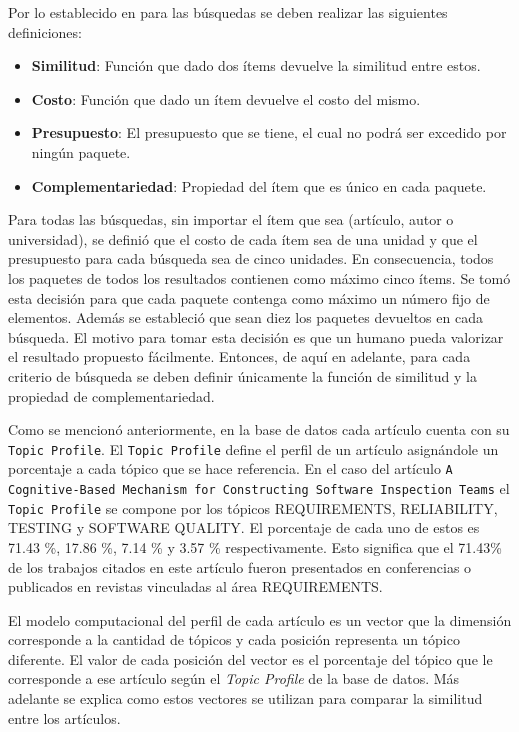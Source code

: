Por lo establecido en \cite{journals/tkde/Amer-YahiaBCFMZ14} para las búsquedas se deben realizar las siguientes definiciones:
\begin{itemize}
  \item \textbf{Similitud}: Función que dado dos ítems devuelve la similitud entre estos.
  \item \textbf{Costo}: Función que dado un ítem devuelve el costo del mismo.
  \item \textbf{Presupuesto}: El presupuesto que se tiene, el cual no podrá ser excedido por ningún paquete.
  \item \textbf{Complementariedad}: Propiedad del ítem que es único en cada paquete.
\end{itemize}

Para todas las búsquedas, sin importar el ítem que sea (artículo, autor o universidad), se definió que el costo de cada ítem sea de una unidad y que el presupuesto para cada búsqueda sea de cinco unidades. En consecuencia, todos los paquetes de todos los resultados contienen como máximo cinco ítems. Se tomó esta decisión para que cada paquete contenga como máximo un número fijo de elementos. Además se estableció que sean diez los paquetes devueltos en cada búsqueda. El motivo para tomar esta decisión es que un humano pueda valorizar el resultado propuesto fácilmente. Entonces, de aquí en adelante, para cada criterio de búsqueda se deben definir únicamente la función de similitud y la propiedad de complementariedad.

Como se mencionó anteriormente, en la base de datos cada artículo cuenta con su \texttt{Topic Profile}. El \texttt{Topic Profile} define el perfil de un artículo asignándole un porcentaje a cada tópico que se hace referencia. En el caso del artículo \texttt{A Cognitive-Based Mechanism for Constructing Software Inspection Teams} el \texttt{Topic Profile} se compone por los tópicos  REQUIREMENTS, RELIABILITY, TESTING y SOFTWARE QUALITY. El porcentaje de cada uno de estos es 71.43 \%, 17.86 \%, 7.14 \% y 3.57 \% respectivamente. Esto significa que el 71.43\% de los trabajos citados en este artículo fueron presentados en conferencias o publicados en revistas vinculadas al área REQUIREMENTS.

El modelo computacional del perfil de cada artículo es un vector que la dimensión corresponde a la cantidad de tópicos y cada posición representa un tópico diferente. El valor de cada posición del vector es el porcentaje del tópico que le corresponde a ese artículo según el \textit{Topic Profile} de la base de datos. Más adelante se explica como estos vectores se utilizan para comparar la similitud entre los artículos.

